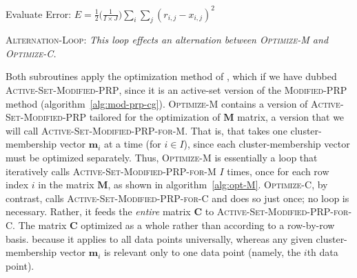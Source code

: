 \begin{algorithm}[h]
 Evaluate Error: $E = \frac{1}{2} \big(\frac{1}{I\times J}\big) \sum_i \sum_j (r_{i,j} - x_{i,j})^2$\;\label{line:init-E} 
\caption{\textsc{Alternation-Loop}: \textit{This loop effects an alternation between \textsc{Optimize-M} and \textsc{Optimize-C}.}}
\label{alg:m-and-c}
\end{algorithm}

Both subroutines apply the 
optimization method of \citet{cheng-and-li:2012}, which if we have 
dubbed \textsc{Active-Set-Modified-PRP}, since it is an active-set version of the 
\textsc{Modified-PRP} method (algorithm~\ref{alg:mod-prp-cg}). 
\textsc{Optimize-M} contains a version of \textsc{Active-Set-Modified-PRP} tailored for
 the optimization of $\textbf{M}$ matrix, a version that we will call \textsc{Active-Set-Modified-PRP-for-M}.
  That is, 
that takes one cluster-membership vector $\textbf{m}_i$ at a time (for $i \in I$), 
since each cluster-membership vector must be optimized separately. 
Thus, \textsc{Optimize-M} is essentially a loop that iteratively calls 
\textsc{Active-Set-Modified-PRP-for-M} $I$ times, once for each row index $i$ in 
the matrix $\textbf{M}$, as shown in algorithm~\ref{alg:opt-M}.
\textsc{Optimize-C}, by contrast, calls \textsc{Active-Set-Modified-PRP-for-C} and does so just once; no loop is necessary. 
Rather, it feeds the \emph{entire} matrix $\textbf{C}$ to 
\textsc{Active-Set-Modified-PRP-for-C}. The matrix $\textbf{C}$ optimized 
as a whole rather than according to a row-by-row basis.
because it applies to all data points universally, 
whereas any given cluster-membership vector $\textbf{m}_i$ is relevant only to one 
data point (namely, the $i$th data point).

